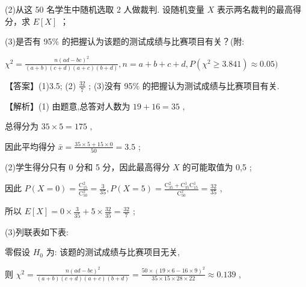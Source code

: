 \documentclass[10pt]{article}
\begin{document}
(2)从这 50 名学生中随机选取 2 人做裁判. 设随机变量 \(X\) 表示两名裁判的最高得分，求 \(E\left\lbrack  X\right\rbrack\) ；

(3)是否有 95\% 的把握认为该题的测试成绩与比赛项目有关？(附:

\({\chi }^{2} = \frac{n{\left( ad - bc\right) }^{2}}{\left( {a + b}\right) \left( {c + d}\right) \left( {a + c}\right) \left( {b + d}\right) },n = a + b + c + d,P\left( {{\chi }^{2} \geq  {3.841}}\right)  \approx  {0.05})\)

【答案】(1)3.5; (2) \(\frac{32}{7}\) ; (3)没有 95\% 的把握认为测试成绩与比赛项目有关.

【解析】(1) 由题意,总答对人数为 \({19} + {16} = {35}\) ,

总得分为 \({35} \times  5 = {175}\) ,

因此平均得分 \(\bar{x} = \frac{{35} \times  5 + {15} \times  0}{50} = {3.5}\) ;

(2)学生得分只有 0 分和 5 分，因此最高得分 \(X\) 的可能取值为 0,5 ;

因此 \(P\left( {X = 0}\right)  = \frac{{\mathrm{C}}_{15}^{2}}{{\mathrm{C}}_{50}^{2}} = \frac{3}{35},P\left( {X = 5}\right)  = \frac{{\mathrm{C}}_{35}^{2} + {\mathrm{C}}_{35}^{1}{\mathrm{C}}_{15}^{1}}{{\mathrm{C}}_{50}^{2}} = \frac{32}{35}\) ,

所以 \(E\left\lbrack  X\right\rbrack   = 0 \times  \frac{3}{35} + 5 \times  \frac{32}{35} = \frac{32}{7}\) ;

(3)列联表如下表:

\begin{center}
\end{center}

零假设 \({H}_{0}\) 为: 该题的测试成绩与比赛项目无关,

则 \({\chi }^{2} = \frac{n{\left( ad - bc\right) }^{2}}{\left( {a + b}\right) \left( {c + d}\right) \left( {a + c}\right) \left( {b + d}\right) } = \frac{{50} \times  {\left( {19} \times  6 - {16} \times  9\right) }^{2}}{{35} \times  {15} \times  {28} \times  {22}} \approx  {0.139}\) ,
\end{document}
